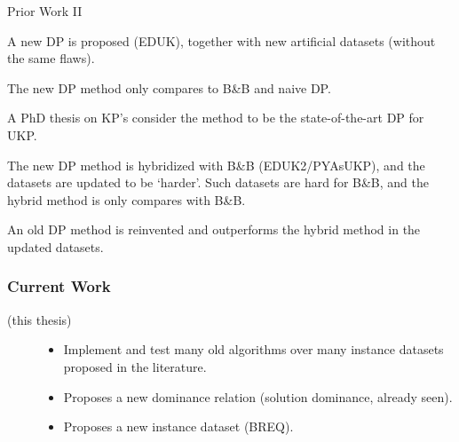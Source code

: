 \documentclass{beamer}
\begin{document}
\begin{frame}{Prior Work II}
\begin{description}
\item<1-1>[1998] A new DP is proposed (EDUK), together with new artificial datasets (without the same flaws). %
\item<2-2>[2000] The new DP method only compares to B\&B and naive DP. %
\item<3-3>[2004] A PhD thesis on KP's consider the method to be the state-of-the-art DP for UKP.
\item<4-4>[2009] The new DP method is hybridized with B\&B (EDUK2/PYAsUKP), and the datasets are updated to be `harder'. Such datasets are hard for B\&B, and the hybrid method is only compares with B\&B. %
\item<5-5>[2016] An old DP method is reinvented and outperforms the hybrid method in the updated datasets.
\end{description}
\end{frame}

\begin{frame}[fragile]
\frametitle{Current Work}
\centering
\begin{description}
\item[(this thesis)] \begin{itemize}
\item Implement and test many old algorithms over many instance datasets proposed in the literature.
\item Proposes a new dominance relation (solution dominance, already seen).
\item Proposes a new instance dataset (BREQ).
\end{itemize}
\end{description}
\end{frame}
\end{document}
